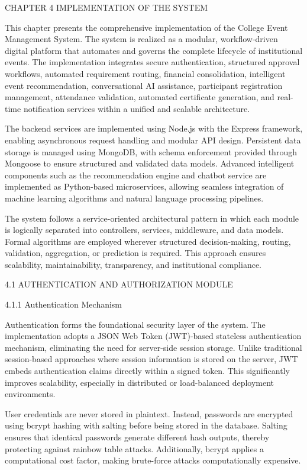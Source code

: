 CHAPTER 4
IMPLEMENTATION OF THE SYSTEM

This chapter presents the comprehensive implementation of the College Event Management System. The system is realized as a modular, workflow-driven digital platform that automates and governs the complete lifecycle of institutional events. The implementation integrates secure authentication, structured approval workflows, automated requirement routing, financial consolidation, intelligent event recommendation, conversational AI assistance, participant registration management, attendance validation, automated certificate generation, and real-time notification services within a unified and scalable architecture.

The backend services are implemented using Node.js with the Express framework, enabling asynchronous request handling and modular API design. Persistent data storage is managed using MongoDB, with schema enforcement provided through Mongoose to ensure structured and validated data models. Advanced intelligent components such as the recommendation engine and chatbot service are implemented as Python-based microservices, allowing seamless integration of machine learning algorithms and natural language processing pipelines.

The system follows a service-oriented architectural pattern in which each module is logically separated into controllers, services, middleware, and data models. Formal algorithms are employed wherever structured decision-making, routing, validation, aggregation, or prediction is required. This approach ensures scalability, maintainability, transparency, and institutional compliance.

4.1 AUTHENTICATION AND AUTHORIZATION MODULE

4.1.1 Authentication Mechanism

Authentication forms the foundational security layer of the system. The implementation adopts a JSON Web Token (JWT)-based stateless authentication mechanism, eliminating the need for server-side session storage. Unlike traditional session-based approaches where session information is stored on the server, JWT embeds authentication claims directly within a signed token. This significantly improves scalability, especially in distributed or load-balanced deployment environments.

User credentials are never stored in plaintext. Instead, passwords are encrypted using bcrypt hashing with salting before being stored in the database. Salting ensures that identical passwords generate different hash outputs, thereby protecting against rainbow table attacks. Additionally, bcrypt applies a computational cost factor, making brute-force attacks computationally expensive.

